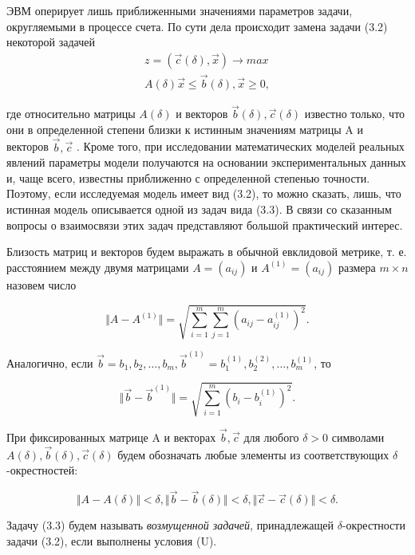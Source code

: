 ЭВМ оперирует лишь приближенными значениями параметров задачи, округляемыми в процессе счета. По сути дела происходит замена задачи (3.2) некоторой задачей
\begin{align}
z = (\overrightarrow{c}( \delta), \overrightarrow{x}) \rightarrow max \\
A (\delta)\overrightarrow{x} \le \overrightarrow{b}(\delta), \overrightarrow{x} \ge 0,
\end{align}

где относительно матрицы $A(\delta)$ и векторов $\overrightarrow{b} \left( \delta \right), \overrightarrow{c} \left( \delta \right)$  известно только, что они в определенной степени близки к истинным значениям матрицы A и векторов $\overrightarrow{b}, \overrightarrow{c}$ . Кроме того, при исследовании математических моделей реальных явлений параметры модели получаются на основании экспериментальных данных и, чаще всего, известны приближенно с определенной степенью точности. Поэтому, если исследуемая модель имеет вид (3.2), то можно сказать, лишь, что истинная модель описывается одной из задач вида (3.3). В связи со сказанным вопросы о взаимосвязи этих задач представляют большой практический интерес.

Близость матриц и векторов будем выражать в обычной евклидовой метрике, т. е. расстоянием между двумя матрицами $A = (a_{ij})$ и $A^{(1)}=(a_{ij})$  размера $m \times n$ назовем число

$$\Vert A-A^{(1)}\Vert = \sqrt{\sum_{i=1}^{m}\sum_{j=1}^{m}(a_{ij} - a_{ij}^{(1)})^2}.$$

Аналогично, если $\overrightarrow{b} = {b_1, b_2, \ldots, b_m}, \overrightarrow{b}^{(1)} = {b^{(1)}_1, b^{(2)}_2, \ldots, b^{(1)}_m}$, то

$$\Vert \overrightarrow{b}-\overrightarrow{b}^{(1)}\Vert = \sqrt{\sum_{i=1}^{m}(b_i - b_i^{(1)})^2}.$$

При фиксированных матрице A и векторах $\overrightarrow{b}, \overrightarrow{c}$  для любого $\delta > 0$ символами $A (\delta ), \overrightarrow{b} ( \delta ), \overrightarrow{c} ( \delta )$ будем обозначать любые элементы из соответствующих $\delta$-окрестностей:

$$\Vert A - A(\delta) \Vert < \delta, \Vert \overrightarrow{b} -\overrightarrow{b}(\delta) \Vert < \delta, \Vert \overrightarrow{c} -\overrightarrow{c}(\delta) \Vert < \delta.$$

Задачу (3.3) будем называть \textit{возмущенной задачей}, принадлежащей $\delta$-окрестности задачи (3.2), если выполнены условия (U).


